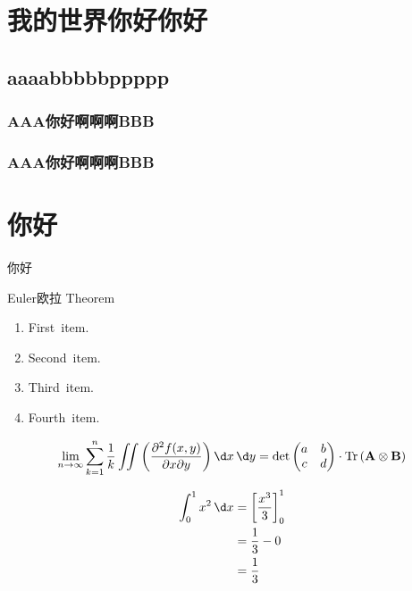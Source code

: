 \documentclass[10pt]{mycls}
\begin{document}
\zhlipsum*[name=zhufu]


\chapter{我的世界你好你好}
\section{aaaabbbbbppppp}
\zhlipsum*[1]

\subsection{AAA你好啊啊啊BBB}
\zhlipsum*[2]

\subsection{AAA你好啊啊啊BBB}
\zhlipsum*[1-3]


\chapter{你好}
你好
\zhlipsum*[1]
\begin{mybox}[colframe=cyan]{Euler欧拉 Theorem}
    \begin{enumerate}
        \item First~item.
        \item Second~item.
        \item Third~item.
        \item Fourth~item.
    \end{enumerate}
    \zhlipsum*[3]
\end{mybox}

\[ 
\lim_{n \to \infty} \sum_{k=1}^{n} \frac{1}{k} \iint
\left( \frac{\partial^{2} f(x,y)}{\partial x \partial y} \right) \d x \, \d y 
= \det \begin{pmatrix} a & b \\ c & d \end{pmatrix} 
\cdot \operatorname{Tr} \left( \mathbf{A} \otimes \mathbf{B} \right)
\]

\zhlipsum*[1]
\begin{align}
\int_{0}^{1} x^{2} \, \d x 
&= \left[ \frac{x^{3}}{3} \right]_{0}^{1} \\
&= \frac{1}{3} - 0 \\
&= \frac{1}{3}
\end{align}
\end{document}

